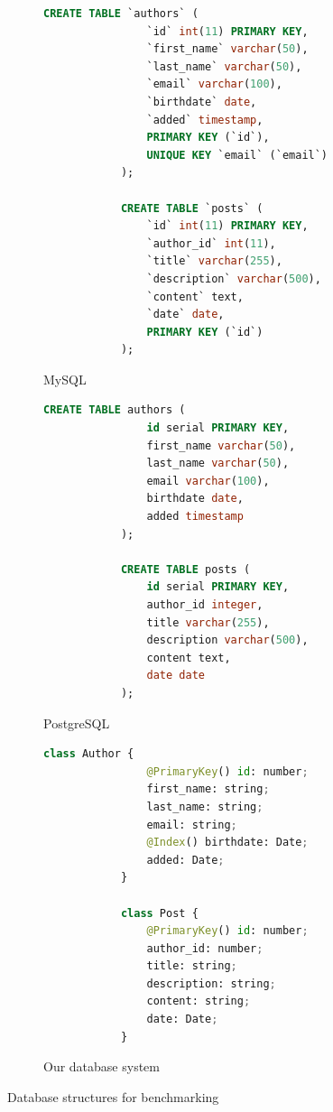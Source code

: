 \begin{figure}[h]
    \begin{subfigure}{.3\textwidth}
        \begin{lstlisting}[language=SQL,basicstyle=\tiny]
            CREATE TABLE `authors` (
                `id` int(11) PRIMARY KEY,
                `first_name` varchar(50),
                `last_name` varchar(50),
                `email` varchar(100),
                `birthdate` date,
                `added` timestamp,
                PRIMARY KEY (`id`),
                UNIQUE KEY `email` (`email`)
            );

            CREATE TABLE `posts` (
                `id` int(11) PRIMARY KEY,
                `author_id` int(11),
                `title` varchar(255),
                `description` varchar(500),
                `content` text,
                `date` date,
                PRIMARY KEY (`id`)
            );
        \end{lstlisting}
        \caption{MySQL}
    \end{subfigure}%
    \begin{subfigure}{.3\textwidth}
        \begin{lstlisting}[language=SQL,basicstyle=\tiny]
            CREATE TABLE authors (
                id serial PRIMARY KEY,
                first_name varchar(50),
                last_name varchar(50),
                email varchar(100),
                birthdate date,
                added timestamp
            );

            CREATE TABLE posts (
                id serial PRIMARY KEY,
                author_id integer,
                title varchar(255),
                description varchar(500),
                content text,
                date date
            );
        \end{lstlisting}
        \caption{PostgreSQL}
    \end{subfigure}
    \begin{subfigure}{.3\textwidth}
        \begin{lstlisting}[language=python,basicstyle=\tiny]
            class Author {
                @PrimaryKey() id: number;
                first_name: string;
                last_name: string;
                email: string;
                @Index() birthdate: Date;
                added: Date;
            }

            class Post {
                @PrimaryKey() id: number;
                author_id: number;
                title: string;
                description: string;
                content: string;
                date: Date;
            }
        \end{lstlisting}
        \caption{Our database system}
    \end{subfigure}
    \caption{Database structures for benchmarking}
    \label{benchDatabaseStructure}
\end{figure}


